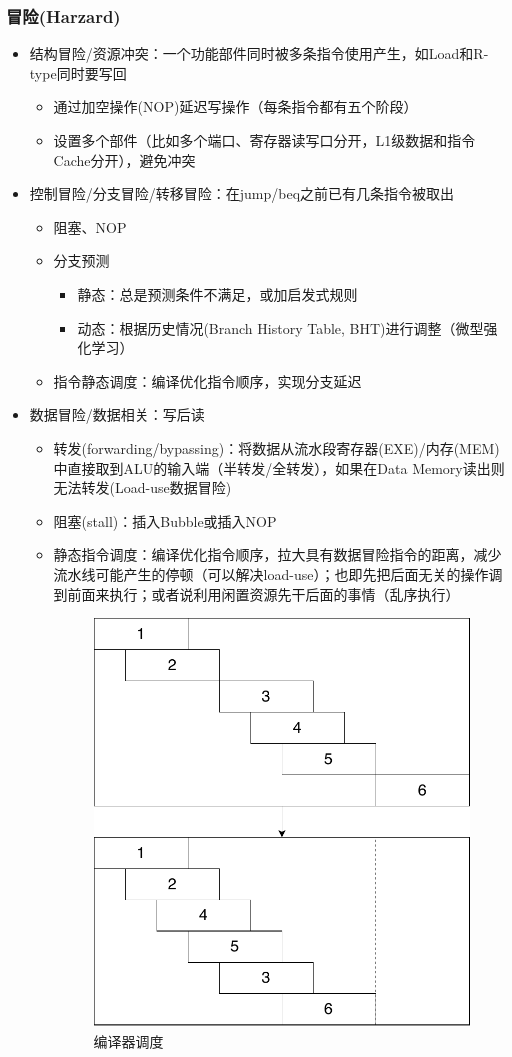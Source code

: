 \subsubsection{冒险(Harzard)}
\begin{itemize}
	\item 结构冒险/资源冲突：一个功能部件同时被多条指令使用产生，如Load和R-type同时要写回
	\begin{itemize}
		\item 通过加空操作(NOP)延迟写操作（每条指令都有五个阶段）
		\item 设置多个部件（比如多个端口、寄存器读写口分开，L1级数据和指令Cache分开），避免冲突
	\end{itemize}
	\item 控制冒险/分支冒险/转移冒险：在jump/beq之前已有几条指令被取出
	\begin{itemize}
		\item 阻塞、NOP
		\item 分支预测 %
		\begin{itemize}
			\item 静态：总是预测条件不满足，或加启发式规则
			\item 动态：根据历史情况(Branch History Table, BHT)进行调整（微型强化学习）
		\end{itemize}
		\item 指令静态调度：编译优化指令顺序，实现分支延迟
	\end{itemize}
	\item 数据冒险/数据相关：写后读
	\begin{itemize}
		\item 转发(forwarding/bypassing)：将数据从流水段寄存器(EXE)/内存(MEM)中直接取到ALU的输入端（半转发/全转发），如果在Data Memory读出则无法转发(Load-use数据冒险)
		\item 阻塞(stall)：插入Bubble或插入NOP
		\item 静态指令调度：编译优化指令顺序，拉大具有数据冒险指令的距离，减少流水线可能产生的停顿（可以解决load-use）；也即先把后面无关的操作调到前面来执行；或者说利用闲置资源先干后面的事情（乱序执行）%
		\begin{figure}[htbp]
		\centering
		\includegraphics[width=0.3\linewidth]{fig/schedule.pdf}
		\caption{编译器调度}
		\end{figure}
	\end{itemize}
\end{itemize}


